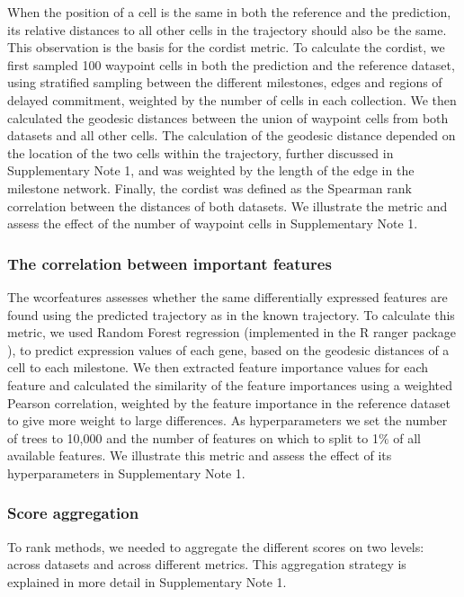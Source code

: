When the position of a cell is the same in both the reference and the prediction, its relative distances to all other cells in the trajectory should also be the same. This observation is the basis for the cordist metric. To calculate the cordist, we first sampled 100 waypoint cells in both the prediction and the reference dataset, using stratified sampling between the different milestones, edges and regions of delayed commitment, weighted by the number of cells in each collection. We then calculated the geodesic distances between the union of waypoint cells from both datasets and all other cells. The calculation of the geodesic distance depended on the location of the two cells within the trajectory, further discussed in Supplementary Note 1, and was weighted by the length of the edge in the milestone network. Finally, the cordist was defined as the Spearman rank correlation between the distances of both datasets. We illustrate the metric and assess the effect of the number of waypoint cells in Supplementary Note 1.

\subsubsection{The correlation between important features}

The wcorfeatures assesses whether the same differentially expressed features are found using the predicted trajectory as in the known trajectory. To calculate this metric, we used Random Forest regression (implemented in the R ranger package \cite{wright_rangerfastimplementation_2017}), to predict expression values of each gene, based on the geodesic distances of a cell to each milestone. We then extracted feature importance values for each feature and calculated the similarity of the feature importances using a weighted Pearson correlation, weighted by the feature importance in the reference dataset to give more weight to large differences. As hyperparameters we set the number of trees to 10,000 and the number of features on which to split to 1$\%$ of all available features. We illustrate this metric and assess the effect of its hyperparameters in Supplementary Note 1.

\subsubsection{Score aggregation}

To rank methods, we needed to aggregate the different scores on two levels: across datasets and across different metrics. This aggregation strategy is explained in more detail in Supplementary Note 1.

